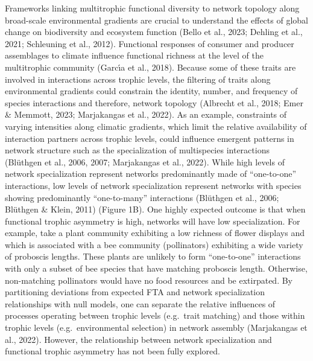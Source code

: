 \documentclass[
]{agujournal2019}
\begin{document}
Frameworks linking multitrophic functional diversity to network topology
along broad-scale environmental gradients are crucial to understand the
effects of global change on biodiversity and ecosystem function (Bello
et al., 2023; Dehling et al., 2021; Schleuning et al., 2012). Functional
responses of consumer and producer assemblages to climate influence
functional richness at the level of the multitrophic community (Garcı́a
et al., 2018). Because some of these traits are involved in interactions
across trophic levels, the filtering of traits along environmental
gradients could constrain the identity, number, and frequency of species
interactions and therefore, network topology (Albrecht et al., 2018;
Emer \& Memmott, 2023; Marjakangas et al., 2022). As an example,
constraints of varying intensities along climatic gradients, which limit
the relative availability of interaction partners across trophic levels,
could influence emergent patterns in network structure such as the
specialization of multispecies interactions (Blüthgen et al., 2006,
2007; Marjakangas et al., 2022). While high levels of network
specialization represent networks predominantly made of ``one-to-one''
interactions, low levels of network specialization represent networks
with species showing predominantly ``one-to-many'' interactions
(Blüthgen et al., 2006; Blüthgen \& Klein, 2011) (Figure 1B). One highly
expected outcome is that when functional trophic asymmetry is high,
networks will have low specialization. For example, take a plant
community exhibiting a low richness of flower displays and which is
associated with a bee community (pollinators) exhibiting a wide variety
of proboscis lengths. These plants are unlikely to form ``one-to-one''
interactions with only a subset of bee species that have matching
proboscis length. Otherwise, non-matching pollinators would have no food
resources and be extirpated. By partitioning deviations from expected
FTA and network specialization relationships with null models, one can
separate the relative influences of processes operating between trophic
levels (e.g.~trait matching) and those within trophic levels
(e.g.~environmental selection) in network assembly (Marjakangas et al.,
2022). However, the relationship between network specialization and
functional trophic asymmetry has not been fully explored.
\end{document}
